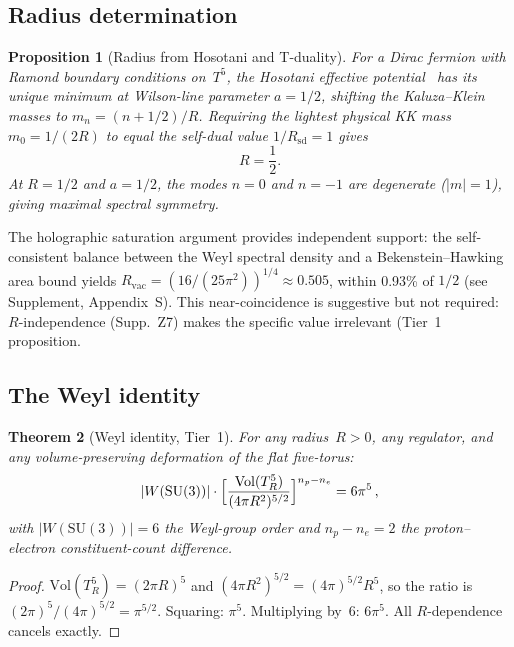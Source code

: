 \documentclass[11pt,a4paper]{article}
\newtheorem{theorem}{Theorem}
\newtheorem{proposition}[theorem]{Proposition}
\theoremstyle{definition}
\theoremstyle{remark}
\begin{document}
\subsection{Radius determination}
\label{sec:radius}

\begin{proposition}[Radius from Hosotani and T-duality]\label{prop:radius}
For a Dirac fermion with Ramond boundary conditions on~$T^5$, the
Hosotani effective potential~\cite{Hosotani1983} has its unique minimum
at Wilson-line parameter $a=1/2$, shifting the Kaluza--Klein masses to
$m_n=(n+1/2)/R$.  Requiring the lightest physical KK mass
$m_0=1/(2R)$ to equal the self-dual value $1/R_{\mathrm{sd}}=1$ gives
\begin{equation}
  R = \frac{1}{2}.
\end{equation}
At $R=1/2$ and $a=1/2$, the modes $n=0$ and $n=-1$ are degenerate
($|m|=1$), giving maximal spectral symmetry.
\end{proposition}

The holographic saturation argument provides independent support: the
self-consistent balance between the Weyl spectral density and a
Bekenstein--Hawking area bound yields
$R_{\mathrm{vac}}=(16/(25\pi^2))^{1/4}\approx 0.505$, within 0.93\% of
$1/2$ (see Supplement, Appendix~S).  This near-coincidence is
suggestive but not required: $R$-independence (Supp.~Z7) makes the specific value irrelevant (Tier~1
proposition.

\subsection{The Weyl identity}

\begin{theorem}[Weyl identity, Tier~1]\label{thm:weyl}
For any radius~$R>0$, any regulator, and any volume-preserving
deformation of the flat five-torus:
\begin{equation}\label{eq:weylthm}
  |W(\mathrm{SU}(3))|\cdot
  \Bigl[\frac{\mathrm{Vol}(T^5_R)}{(4\pi R^2)^{5/2}}\Bigr]^{n_p-n_e}
  = 6\pi^5\,,
\end{equation}
with $|W(\mathrm{SU}(3))|=6$ the Weyl-group order and $n_p-n_e=2$ the
proton--electron constituent-count difference.
\end{theorem}

\begin{proof}
$\mathrm{Vol}(T^5_R)=(2\pi R)^5$ and $(4\pi R^2)^{5/2}=
(4\pi)^{5/2}R^5$, so the ratio is
$(2\pi)^5/(4\pi)^{5/2}=\pi^{5/2}$.
Squaring: $\pi^5$.  Multiplying by~$6$: $6\pi^5$.  All
$R$-dependence cancels exactly.
\end{proof}
\end{document}
